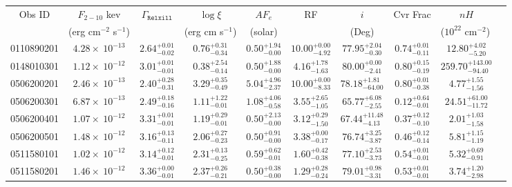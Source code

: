 \documentclass{article}
\begin{document}
\begin{landscape}
\begin{longtable}{cccccccccl}
\hline \multicolumn{1}{c}{Obs ID} & \multicolumn{1}{c}{$F_{2-10}$ kev} & \multicolumn{1}{c}{$\Gamma_\texttt{Relxill}$} & \multicolumn{1}{c}{$\log \xi$} & \multicolumn{1}{c}{$AF_e$} & \multicolumn{1}{c}{RF} & \multicolumn{1}{c}{$\textit{i}$} & \multicolumn{1}{c}{Cvr Frac} & \multicolumn{1}{c}{$nH$}\\  
\multicolumn{1}{c}{} & \multicolumn{1}{c}{(erg cm$^{-2}$ s$^{-1}$)} & \multicolumn{1}{c}{} & \multicolumn{1}{c}{(erg cm s$^{-1}$)} & \multicolumn{1}{c}{(solar)} & \multicolumn{1}{c}{} & \multicolumn{1}{c}{(Deg)} & \multicolumn{1}{c}{} & \multicolumn{1}{l}{($10^{22}$ cm$^{-2}$)}\\ \hline 
0110890201 & $4.28 \times~10^{-13}$ & $2.64^{+0.01}_{-0.02}$ & $0.76^{+0.31}_{-0.34}$ & $0.50^{+1.94}_{-0.00}$ & $10.00^{+0.00}_{-4.92}$ & $77.95^{+2.04}_{-0.30}$ &  $0.74^{+0.01}_{-0.11}$ & $12.80^{+4.02}_{-5.20}$ \\
0148010301 & $1.12 \times~10^{-12}$ & $3.01^{+0.01}_{-0.01}$ & $0.38^{+2.54}_{-0.14}$ & $0.50^{+1.88}_{-0.00}$ & $4.16^{+1.78}_{-1.63}$ & $80.00^{+0.00}_{-2.41}$ &  $0.80^{+0.15}_{-0.19}$ & $259.70^{+143.00}_{-94.40}$  \\
0506200201 & $2.46 \times~10^{-13}$ & $2.40^{+0.28}_{-0.31}$ & $3.29^{+0.35}_{-0.49}$ & $5.04^{+4.96}_{-2.37}$ & $10.00^{+0.00}_{-8.33}$ & $78.18^{+1.81}_{-64.00}$ &  $0.80^{+0.01}_{-0.38}$ & $4.77^{+1.55}_{-1.56}$\\
0506200301 & $6.87 \times~10^{-13}$ & $2.49^{+0.18}_{-0.16}$ & $1.11^{+1.22}_{-0.01}$ & $1.08^{+4.06}_{-0.58}$ & $3.55^{+2.65}_{-1.05}$ & $65.77^{+6.08}_{-2.55}$ &  $0.12^{+0.64}_{-0.01}$ & $24.51^{+61.00}_{-11.72}$\\ 
0506200401 & $1.07 \times~10^{-12}$ & $3.31^{+0.01}_{-0.01}$ & $1.19^{+0.29}_{-0.01}$ & $0.50^{+2.13}_{-0.00}$ & $3.12^{+0.29}_{-1.50}$ & $67.44^{+11.48}_{-4.13}$ &  $0.37^{+0.12}_{-0.10}$ & $2.01^{+1.03}_{-1.58}$ \\ 
0506200501 & $1.48 \times~10^{-12}$ & $3.16^{+0.13}_{-0.11}$ & $2.06^{+0.27}_{-0.23}$ & $0.50^{+0.91}_{-0.00}$ & $3.38^{+0.00}_{-0.17}$ & $76.74^{+3.25}_{-3.87}$ &  $0.46^{+0.12}_{-0.14}$ & $5.81^{+1.15}_{-1.19}$ \\ 
0511580101 & $1.02 \times~10^{-12}$ & $3.14^{+0.12}_{-0.01}$ & $2.31^{+0.13}_{-0.25}$ & $0.59^{+0.62}_{-0.01}$ & $1.60^{+0.42}_{-0.38}$ & $77.10^{+2.53}_{-3.73}$ &  $0.54^{+0.01}_{-0.01}$ & $5.32^{+0.69}_{-0.91}$   \\ 
0511580201 & $1.46 \times~10^{-12}$ & $3.36^{+0.00}_{-0.01}$ & $2.37^{+0.26}_{-0.21}$ & $0.50^{+0.38}_{-0.00}$ & $1.29^{+0.28}_{-0.24}$ & $79.01^{+0.98}_{-3.31}$ &  $0.53^{+0.01}_{-0.01}$ & $3.74^{+1.20}_{-2.98}$\\ 

\end{longtable}
\end{landscape}
\end{document}
